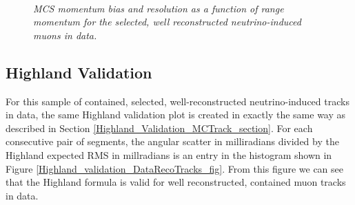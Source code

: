 \begin{figure}
\centering
\mbox{
	\quad
	}
\caption{\textit{MCS momentum bias and resolution as a function of range momentum for the selected, well reconstructed neutrino-induced muons in {\ub} data.}}
\label{MCS_range_bias_resolution_DataRecoTrack_fig}
\end{figure}



\subsection{Highland Validation}\label{Highland_Validation_DataRecoTrack_section}
For this sample of contained, selected, well-reconstructed neutrino-induced tracks in {\ub} data, the same Highland validation plot is created in exactly the same way as described in Section \ref{Highland_Validation_MCTrack_section}. For each consecutive pair of segments, the angular scatter in milliradians divided by the Highland expected RMS in millradians is an entry in the histogram shown in Figure \ref{Highland_validation_DataRecoTracks_fig}. From this figure we can see that the Highland formula is valid for well reconstructed, contained muon tracks in data.

